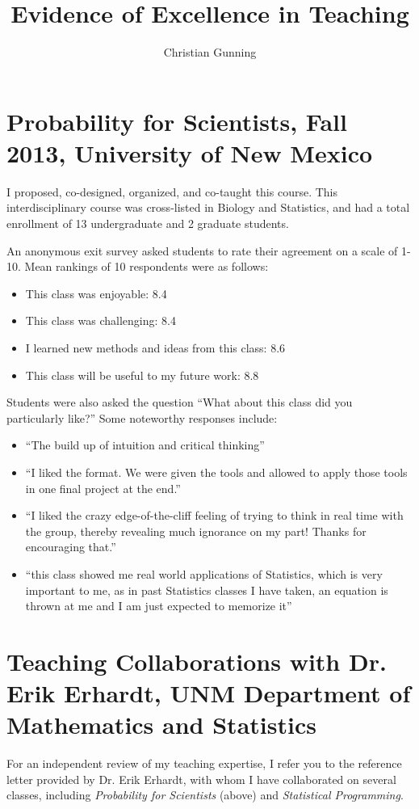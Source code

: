 \documentclass[12pt]{article}
\author{Christian Gunning}
\title{Evidence of Excellence in Teaching}
\begin{document}
\maketitle
\thispagestyle{empty}
\linespread{1.25}\selectfont

\section*{Probability for Scientists, Fall 2013, University of New Mexico}
I proposed, co-designed, organized, and co-taught this course. 
This interdisciplinary course was cross-listed in Biology and Statistics, 
and had a total enrollment of 13 undergraduate and 2 graduate
students.

An anonymous exit survey asked students to rate their agreement on a
scale of 1-10.  Mean rankings of 10 respondents were as follows:

\begin{itemize}
\item This class was enjoyable: 8.4
\item This class was challenging: 8.4
\item I learned new methods and ideas from this class: 8.6
\item This class will be useful to my future work: 8.8
\end{itemize}

Students were also asked the question ``What about this class did
you particularly like?'' Some noteworthy responses include:

\begin{itemize}
\item ``The build up of intuition and critical thinking''
\item ``I liked the format. We were given the tools and allowed to apply those
tools in one final project at the end.''
\item ``I liked the crazy edge-of-the-cliff feeling of trying to think in real
time with the group, thereby revealing much ignorance on my part! Thanks for
encouraging that.''
\item ``this class showed me real world applications of Statistics, which is very
important to me, as in past Statistics classes I have taken, an equation is
thrown at me and I am just expected to memorize it''
\end{itemize}

\section*{Teaching Collaborations with Dr. Erik Erhardt, UNM Department of Mathematics and Statistics}
For an independent review of my teaching expertise, I refer you to the reference letter provided 
by Dr. Erik Erhardt, with whom I have collaborated on several classes, 
including {\em Probability for Scientists} (above) and {\em Statistical Programming}.
\end{document}
